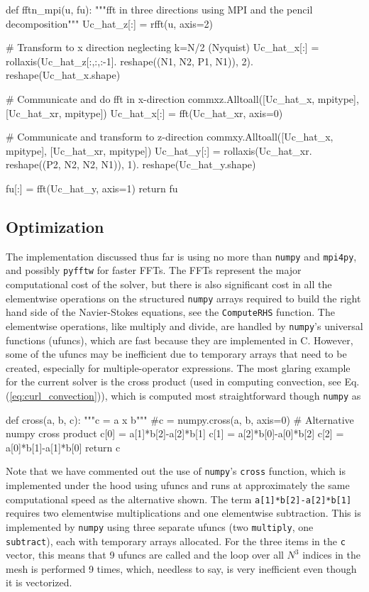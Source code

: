 \documentclass[final,1p,times]{elsarticle}
\newcommand{\inpyth}{\lstinline[style=inlinestyle]} %[]%
\begin{document}
\begin{python}
def fftn_mpi(u, fu):
    """fft in three directions using MPI and the pencil decomposition"""
    Uc_hat_z[:] = rfft(u, axis=2)

    # Transform to x direction neglecting k=N/2 (Nyquist)
    Uc_hat_x[:] = rollaxis(Uc_hat_z[:,:,:-1].
      reshape((N1, N2, P1, N1)), 2).
      reshape(Uc_hat_x.shape)

    # Communicate and do fft in x-direction
    commxz.Alltoall([Uc_hat_x, mpitype],
                    [Uc_hat_xr, mpitype])
    Uc_hat_x[:] = fft(Uc_hat_xr, axis=0)

    # Communicate and transform to z-direction
    commxy.Alltoall([Uc_hat_x, mpitype],
                    [Uc_hat_xr, mpitype])
    Uc_hat_y[:] = rollaxis(Uc_hat_xr.
      reshape((P2, N2, N2, N1)), 1).
      reshape(Uc_hat_y.shape)

    fu[:] = fft(Uc_hat_y, axis=1)
    return fu
\end{python}

\subsection{Optimization}
\label{sec:optimization}
The implementation discussed thus far is using no more than \texttt{numpy} and \texttt{mpi4py}, and possibly \texttt{pyfftw} for faster FFTs. The FFTs represent the major computational cost of the solver, but there is also significant cost in all the elementwise operations on the structured \texttt{numpy} arrays required to build the right hand side of the Navier-Stokes equations, see the \inpyth{ComputeRHS} function. The elementwise operations, like multiply and divide, are handled by \texttt{numpy}'s universal functions (ufuncs), which are fast because they are implemented in C. However, some of the ufuncs may be inefficient due to temporary arrays that need to be created, especially for multiple-operator expressions. The most glaring example for the current solver is the cross product (used in computing convection, see Eq. (\ref{eq:curl_convection})), which is computed most straightforward though \texttt{numpy} as
\begin{python}
def cross(a, b, c):
    """c = a x b"""
    #c = numpy.cross(a, b, axis=0)   # Alternative numpy cross product
    c[0] = a[1]*b[2]-a[2]*b[1]
    c[1] = a[2]*b[0]-a[0]*b[2]
    c[2] = a[0]*b[1]-a[1]*b[0]
    return c
\end{python}
Note that we have commented out the use of \texttt{numpy}'s \inpyth{cross} function, which is implemented under the hood using ufuncs and runs at approximately the same computational speed as the alternative shown. The term \inpyth{a[1]*b[2]-a[2]*b[1]} requires two elementwise multiplications and one elementwise subtraction. This is implemented by \texttt{numpy} using three separate ufuncs (two \inpyth{multiply}, one \inpyth{subtract}), each with temporary arrays allocated. For the three items in the \inpyth{c} vector, this means that 9 ufuncs are called and the loop over all $N^3$ indices in the mesh is performed 9 times, which, needless to say, is very inefficient even though it is vectorized.
\end{document}
